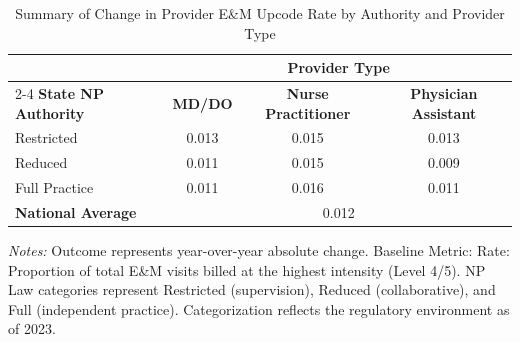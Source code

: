 \begin{table}[htbp]
    \centering
    \caption{Summary of Change in Provider E\&M Upcode Rate by Authority and Provider Type}
    \label{tab:d_partb_em_upcode_rate_provtype}
    \vspace{0.2cm}
    \begin{tabular}{lccc}
        \toprule
        & \multicolumn{3}{c}{\textbf{Provider Type}} \\
        \cmidrule(lr){2-4}
        \textbf{State NP Authority} & \textbf{MD/DO} & \textbf{Nurse Practitioner} & \textbf{Physician Assistant} \\
        \midrule
        Restricted & 0.013 & 0.015 & 0.013 \\
        Reduced & 0.011 & 0.015 & 0.009 \\
        Full Practice & 0.011 & 0.016 & 0.011 \\
        \midrule
        \textbf{National Average} & \multicolumn{3}{c}{0.012} \\
        \bottomrule
    \end{tabular}
    \vspace{0.1cm}
    \begin{minipage}{0.85\textwidth}
        \footnotesize \textit{Notes:} Outcome represents year-over-year absolute change. Baseline Metric: Rate: Proportion of total E\&M visits billed at the highest intensity (Level 4/5). NP Law categories represent Restricted (supervision), Reduced (collaborative), and Full (independent practice). Categorization reflects the regulatory environment as of 2023.
    \end{minipage}
\end{table}